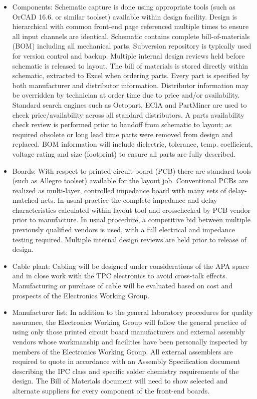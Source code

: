 \begin{itemize}
\item Components: Schematic capture is done using appropriate tools (such as OrCAD 16.6. or similar toolset) available within design facility. Design is hierarchical with common front-end page referenced multiple times to ensure all input channels are identical. Schematic contains complete bill-of-materials (BOM) including all mechanical parts. Subversion repository is typically used for version control and backup. Multiple internal design reviews held before schematic is released to layout. The bill of materials is stored directly within schematic, extracted to Excel when ordering parts. Every part is specified by both manufacturer and distributor information. Distributor information may be overridden by technician at order time due to price and/or availability. Standard search engines such as Octopart, ECIA and PartMiner are used to check price/availability across all standard distributors. A parts availability check review is performed prior to handoff from schematic to layout; as required obsolete or long lead time parts were removed from design and replaced. BOM information will include dielectric, tolerance, temp. coefficient, voltage rating and size (footprint) to ensure all parts are fully described.
\item Boards: With respect to printed-circuit-board (PCB) there are standard tools (such as Allegro toolset) available for the layout job. Conventional PCBs are realized as multi-layer, controlled impedance board with many sets of delay-matched nets. In usual practice the complete impedance and delay characteristics calculated within layout tool and crosschecked by PCB vendor prior to manufacture. In usual procedure, a competitive bid between multiple previously qualified vendors is used, with a full electrical and impedance testing required. Multiple internal design reviews are held prior to release of design.
\item Cable plant: Cabling will be designed under considerations of the APA space and in close work with the TPC electronics to avoid cross-talk effects.  Manufacturing or purchase of cable will be evaluated based on cost and prospects of the Electronics Working Group.   
\item Manufacturer list: In addition to the general laboratory procedures for quality assurance, the Electronics Working Group will follow the general practice of using only those printed circuit board manufacturers and external assembly vendors whose workmanship and facilities have been personally inspected by members of the Electronics Working Group. All external assemblers are required to quote in accordance with an Assembly Specification document describing the IPC class and specific solder chemistry requirements of the design. The Bill of Materials document will need to show selected and alternate suppliers for every component of the front-end boards.
\end{itemize}

